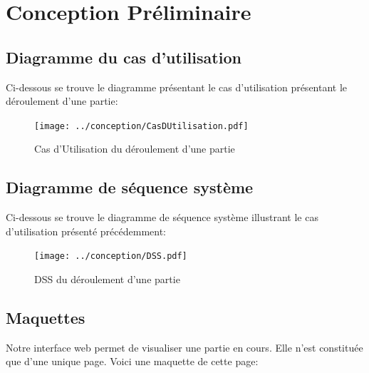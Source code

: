 \chapter{Conception Préliminaire}
\thispagestyle{fancy}

\section{Diagramme du cas d'utilisation}

Ci-dessous se trouve le diagramme présentant le cas d'utilisation présentant le déroulement d'une partie:
    
\begin{figure}[h!]
\begin{center}
\texttt{[image: ../conception/CasDUtilisation.pdf]}
\caption{Cas d'Utilisation du déroulement d'une partie}
\end{center}
\end{figure}


\newpage
\section{Diagramme de séquence système}
Ci-dessous se trouve le diagramme de séquence système illustrant le cas d'utilisation présenté précédemment:
\begin{figure}[h!]
\begin{center}
\texttt{[image: ../conception/DSS.pdf]}
\caption{DSS du déroulement d'une partie}
\end{center}
\end{figure}

\newpage
\section{Maquettes}
Notre interface web permet de visualiser une partie en cours. Elle n'est constituée que d'une unique page. Voici une maquette de cette page:

